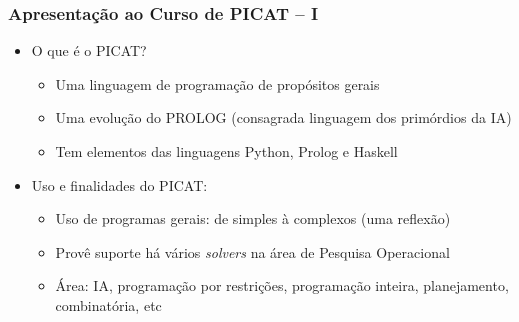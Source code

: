 \begin{frame}[fragile]

  \frametitle{Apresentação ao Curso de PICAT -- I}
  \begin{itemize}
    \item O que é o PICAT?
    \pause
       \begin{itemize}
			\item Uma linguagem de programação de propósitos gerais
			\item Uma evolução do PROLOG (consagrada linguagem dos primórdios da IA)
			\item Tem elementos das linguagens Python, Prolog e Haskell
		\end{itemize}

    \item Uso e finalidades do PICAT:
    \pause
       \begin{itemize}
			\item Uso de programas gerais: de simples à complexos (uma reflexão)
			\item Provê suporte há vários \textit{solvers} na área de Pesquisa Operacional
			\item Área: IA, programação por restrições, programação inteira, planejamento,
			combinatória, etc
		\end{itemize}

   \end{itemize}

  \end{frame}
    
